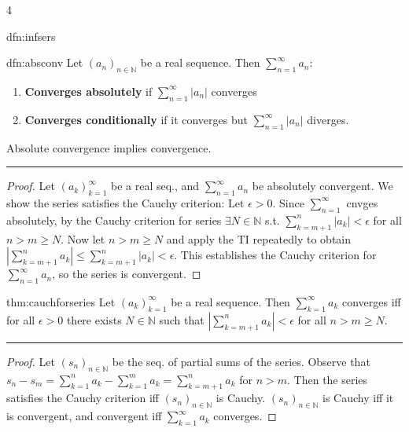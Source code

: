 \documentclass[landscape, 8pt]{extarticle}
\begin{document}
\begin{multicols*}{4}
\begin{mdfn}{dfn:infsers}{ }
		\end{mdfn}
		
		
		\begin{dfn}{dfn:absconv}{ }
			Let $(a_n)_{n \in \mathbb{N}}$ be a real sequence. Then $\sum_{n=1}^{\infty} a_n$:
			\begin{enumerate}[label=(\arabic*)]
				\item \textbf{Converges absolutely} if $\sum_{n=1}^{\infty} \left|a_n\right|$ converges
				\item \textbf{Converges conditionally} if it converges but $\sum_{n=1}^{\infty}\left|a_n\right|$ diverges.
			\end{enumerate}
			
			Absolute convergence implies convergence.
			\vspace{1pt}
			\hrule	
			\vspace{-6pt}
			\begin{proof}
				Let $(a_k)_{k=1}^\infty$ be a real seq., and $\sum_{n=1}^{\infty}a_n$ be absolutely convergent. We show the series satisfies the Cauchy criterion: Let $\epsilon > 0$. Since $\sum_{n=1}^\infty$ cnvges absolutely, by the Cauchy criterion for series $\exists N\in \mathbb{N}$ s.t. $\sum_{k=m+1}^{n}\left|a_k\right| <\epsilon$ for all $n > m \ge N$. Now let $n > m \ge N$ and apply the TI repeatedly to obtain $\left|\sum_{k=m+1}^n a_k\right| \le \sum_{k=m+1}^n \left|a_k\right| <\epsilon$. This establishes the Cauchy criterion for $\sum_{n=1}^\infty a_n$, so the series is convergent.
			\end{proof}
			
		\end{dfn}
		
		
		\begin{mthm}{thm:cauchforseries}{ }
		Let $(a_k)_{k=1}^\infty$ be a real sequence. Then $\sum_{k=1}^{\infty}a_k$ converges iff for all $\epsilon > 0$ there exists $N \in \mathbb{N}$ such that $\left|\sum_{k=m+1}^{n}a_k\right| <\epsilon$ for all $n > m \ge N$.
		\vspace{1pt}
		\hrule	
		\vspace{-6pt}
		\begin{proof}
			Let $(s_n)_{n\in \mathbb{N}}$ be the seq. of partial sums of the series. Observe that $s_n - s_m = \sum_{k=1}^{n}a_k - \sum_{k=1}^{m}a_k = \sum_{k=m+1}^{n}a_k$ for $n > m$. Then the series satisfies the Cauchy criterion iff $(s_n)_{n\in \mathbb{N}}$ is Cauchy. $(s_n)_{n\in \mathbb{N}}$ is Cauchy iff it is convergent, and convergent iff $\sum_{k=1}^{\infty}a_k$ converges.
		\end{proof}
		

\end{mthm}
\end{multicols*}
\end{document}

